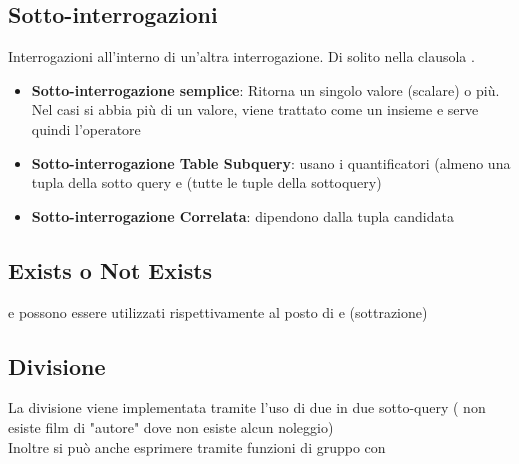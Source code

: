 \subsection{Sotto-interrogazioni}
Interrogazioni all'interno di un'altra interrogazione. Di solito nella clausola .
\begin{itemize}
    \item \textbf{Sotto-interrogazione semplice}: Ritorna un singolo valore (scalare) o più. Nel casi si abbia più di un valore, viene trattato come un insieme e serve quindi l'operatore 
    \item \textbf{Sotto-interrogazione Table Subquery}: usano i quantificatori  (almeno una tupla della sotto query e  (tutte le tuple della sottoquery)
    \item \textbf{Sotto-interrogazione Correlata}: dipendono dalla tupla candidata
\end{itemize}

\subsection{Exists o Not Exists}
 e  possono essere utilizzati rispettivamente al posto di  e  (sottrazione)

\subsection{Divisione}
La divisione viene implementata tramite l'uso di due  in due sotto-query ( non esiste film di "autore" dove non esiste alcun noleggio)\\
Inoltre si può anche esprimere tramite funzioni di gruppo con 
